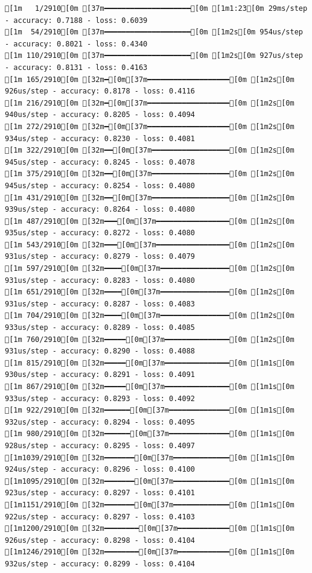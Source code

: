 \documentclass[
  letterpaper,
  DIV=11,
  numbers=noendperiod]{scrartcl}
\begin{document}
\begin{verbatim}
[1m   1/2910[0m [37m━━━━━━━━━━━━━━━━━━━━[0m [1m1:23[0m 29ms/step - accuracy: 0.7188 - loss: 0.6039
[1m  54/2910[0m [37m━━━━━━━━━━━━━━━━━━━━[0m [1m2s[0m 954us/step - accuracy: 0.8021 - loss: 0.4340 
[1m 110/2910[0m [37m━━━━━━━━━━━━━━━━━━━━[0m [1m2s[0m 927us/step - accuracy: 0.8131 - loss: 0.4163
[1m 165/2910[0m [32m━[0m[37m━━━━━━━━━━━━━━━━━━━[0m [1m2s[0m 926us/step - accuracy: 0.8178 - loss: 0.4116
[1m 216/2910[0m [32m━[0m[37m━━━━━━━━━━━━━━━━━━━[0m [1m2s[0m 940us/step - accuracy: 0.8205 - loss: 0.4094
[1m 272/2910[0m [32m━[0m[37m━━━━━━━━━━━━━━━━━━━[0m [1m2s[0m 934us/step - accuracy: 0.8230 - loss: 0.4081
[1m 322/2910[0m [32m━━[0m[37m━━━━━━━━━━━━━━━━━━[0m [1m2s[0m 945us/step - accuracy: 0.8245 - loss: 0.4078
[1m 375/2910[0m [32m━━[0m[37m━━━━━━━━━━━━━━━━━━[0m [1m2s[0m 945us/step - accuracy: 0.8254 - loss: 0.4080
[1m 431/2910[0m [32m━━[0m[37m━━━━━━━━━━━━━━━━━━[0m [1m2s[0m 939us/step - accuracy: 0.8264 - loss: 0.4080
[1m 487/2910[0m [32m━━━[0m[37m━━━━━━━━━━━━━━━━━[0m [1m2s[0m 935us/step - accuracy: 0.8272 - loss: 0.4080
[1m 543/2910[0m [32m━━━[0m[37m━━━━━━━━━━━━━━━━━[0m [1m2s[0m 931us/step - accuracy: 0.8279 - loss: 0.4079
[1m 597/2910[0m [32m━━━━[0m[37m━━━━━━━━━━━━━━━━[0m [1m2s[0m 931us/step - accuracy: 0.8283 - loss: 0.4080
[1m 651/2910[0m [32m━━━━[0m[37m━━━━━━━━━━━━━━━━[0m [1m2s[0m 931us/step - accuracy: 0.8287 - loss: 0.4083
[1m 704/2910[0m [32m━━━━[0m[37m━━━━━━━━━━━━━━━━[0m [1m2s[0m 933us/step - accuracy: 0.8289 - loss: 0.4085
[1m 760/2910[0m [32m━━━━━[0m[37m━━━━━━━━━━━━━━━[0m [1m2s[0m 931us/step - accuracy: 0.8290 - loss: 0.4088
[1m 815/2910[0m [32m━━━━━[0m[37m━━━━━━━━━━━━━━━[0m [1m1s[0m 930us/step - accuracy: 0.8291 - loss: 0.4091
[1m 867/2910[0m [32m━━━━━[0m[37m━━━━━━━━━━━━━━━[0m [1m1s[0m 933us/step - accuracy: 0.8293 - loss: 0.4092
[1m 922/2910[0m [32m━━━━━━[0m[37m━━━━━━━━━━━━━━[0m [1m1s[0m 932us/step - accuracy: 0.8294 - loss: 0.4095
[1m 980/2910[0m [32m━━━━━━[0m[37m━━━━━━━━━━━━━━[0m [1m1s[0m 928us/step - accuracy: 0.8295 - loss: 0.4097
[1m1039/2910[0m [32m━━━━━━━[0m[37m━━━━━━━━━━━━━[0m [1m1s[0m 924us/step - accuracy: 0.8296 - loss: 0.4100
[1m1095/2910[0m [32m━━━━━━━[0m[37m━━━━━━━━━━━━━[0m [1m1s[0m 923us/step - accuracy: 0.8297 - loss: 0.4101
[1m1151/2910[0m [32m━━━━━━━[0m[37m━━━━━━━━━━━━━[0m [1m1s[0m 922us/step - accuracy: 0.8297 - loss: 0.4103
[1m1200/2910[0m [32m━━━━━━━━[0m[37m━━━━━━━━━━━━[0m [1m1s[0m 926us/step - accuracy: 0.8298 - loss: 0.4104
[1m1246/2910[0m [32m━━━━━━━━[0m[37m━━━━━━━━━━━━[0m [1m1s[0m 932us/step - accuracy: 0.8299 - loss: 0.4104

\end{verbatim}
\end{document}
